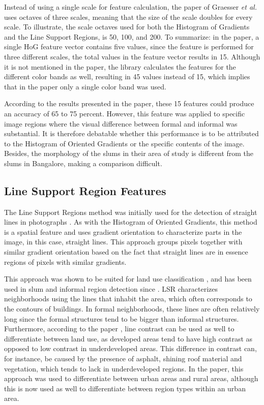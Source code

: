 Instead of using a single scale for feature calculation, the paper of Graesser \textit{et al.} uses octaves of three scales, meaning that the size of the scale doubles for every scale. To illustrate, the scale octaves used for both the Histogram of Gradients and the Line Support Regions, is 50, 100, and 200. To summarize: in the paper, a single HoG feature vector contains five values, since the feature is performed for three different scales, the total values in the feature vector results in 15. Although it is not mentioned in the paper, the library calculates the features for the different color bands as well, resulting in 45 values instead of 15, which implies that in the paper only a single color band was used.

According to the results presented in the paper, these 15 features could produce an accuracy of 65 to 75 percent. However, this feature was applied to specific image regions where the visual difference between formal and informal was substantial. It is therefore debatable whether this performance is to be attributed to the Histogram of Oriented Gradients or the specific contents of the image. Besides, the morphology of the slums in their area of study is different from the slums in Bangalore, making a comparison difficult.


\subsection{Line Support Region Features}

The Line Support Regions method was initially used for the detection of straight lines in photographs \cite{burns1986extracting}. As with the Histogram of Oriented Gradients, this method is a spatial feature and uses gradient orientation to characterize parts in the image, in this case, straight lines. This approach groups pixels together with similar gradient orientation based on the fact that straight lines are in essence regions of pixels with similar gradients. 

This approach was shown to be suited for land use classification \cite{unsalan2004classifying} \cite{unsalan2006gradient}, and has been used in slum and informal region detection since \cite{graesser2012image} \cite{accra} \cite{colombo}. LSR characterizes neighborhoods using the lines that inhabit the area, which often corresponds to the contours of buildings. In formal neighborhoods, these lines are often relatively long since the formal structures tend to be bigger than informal structures. Furthermore, according to the paper \cite{unsalan2004classifying}, line contrast can be used as well to differentiate between land use, as developed areas tend to have high contrast as opposed to low contrast in underdeveloped areas. This difference in contrast can, for instance, be caused by the presence of asphalt, shining roof material and vegetation, which tends to lack in underdeveloped regions. In the paper, this approach was used to differentiate between urban areas and rural areas, although this is now used as well to differentiate between region types within an urban area.

